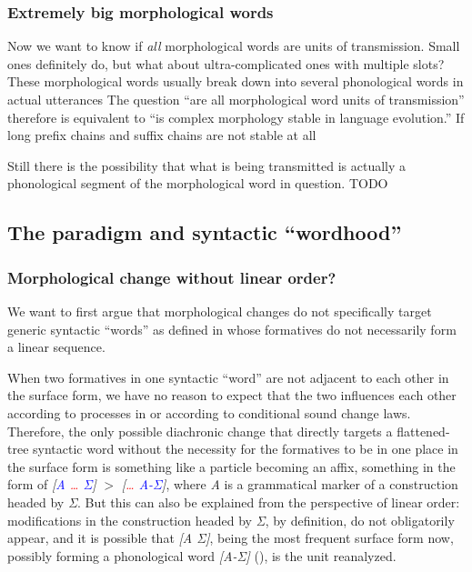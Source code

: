\documentclass[a4paper, oneside, scheme=plain, 12pt]{article}
\newcommand{\form}[1]{\emph{#1}}
\newcommand*{\textgt}{$>$ }
\begin{document}
\subsubsection{Extremely big morphological words}\label{sec:extremely-big-morphological-words}

Now we want to know if \emph{all} morphological words are units of transmission.
Small ones definitely do, but what about ultra-complicated ones with multiple slots?
These morphological words usually break down into several phonological words in actual utterances 
The question ``are all morphological word units of transmission'' therefore is equivalent to 
``is complex morphology stable in language evolution.''
If long prefix chains and suffix chains are not stable at all

Still there is the possibility that what is being transmitted is actually
a phonological segment of the morphological word in question.
TODO



\subsection{The paradigm and syntactic ``wordhood''}

\subsubsection{Morphological change without linear order?}\label{sec:morphological-change-based-on-syntactic-word}

We want to first argue that morphological changes do not specifically target
generic syntactic ``words'' as defined in 
whose formatives do not necessarily form a linear sequence.

When two formatives in one syntactic ``word'' are not adjacent to each other in the surface form,
we have no reason to expect that the two influences each other according to processes in 
or according to conditional sound change laws.
Therefore, the only possible diachronic change that directly targets a flattened-tree syntactic word
without the necessity for the formatives to be in one place in the surface form
is something like a particle becoming an affix, 
something in the form of \form{[\textcolor{blue}{A} \textcolor{red}{\dots} \textcolor{blue}{Σ}]} \textgt \form{[\textcolor{red}{\dots} \textcolor{blue}{A-Σ}]},
where \form{A} is a grammatical marker of a construction headed by \form{Σ}.
But this can also be explained from the perspective of linear order:
modifications in the construction headed by \form{Σ}, by definition, do not obligatorily appear,
and it is possible that \form{[A Σ]}, being the most frequent surface form now, possibly forming a phonological word \form{[A-Σ]} (), is the unit reanalyzed. 
\end{document}
